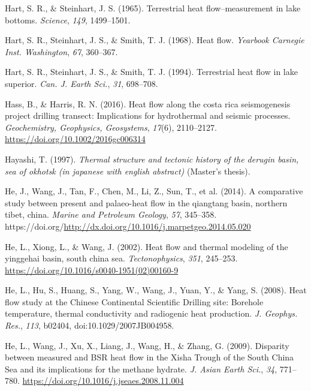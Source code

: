 \begin{CSLReferences}{1}{1}
\leavevmode{}%
Hart, S. R., \& Steinhart, J. S. (1965). Terrestrial heat flow--measurement in lake bottoms. \emph{Science}, \emph{149}, 1499--1501.

\leavevmode{}%
Hart, S. R., Steinhart, J. S., \& Smith, T. J. (1968). Heat flow. \emph{Yearbook Carnegie Inst. Washington}, \emph{67}, 360--367.

\leavevmode{}%
Hart, S. R., Steinhart, J. S., \& Smith, T. J. (1994). Terrestrial heat flow in lake superior. \emph{Can. J. Earth Sci.}, \emph{31}, 698--708.

\leavevmode{}%
Hass, B., \& Harris, R. N. (2016). Heat flow along the costa rica seismogenesis project drilling transect: Implications for hydrothermal and seismic processes. \emph{Geochemistry, Geophysics, Geosystems}, \emph{17}(6), 2110--2127. \url{https://doi.org/10.1002/2016gc006314}

\leavevmode{}%
Hayashi, T. (1997). \emph{Thermal structure and tectonic history of the derugin basin, sea of okhotsk (in japanese with english abstract)} (Master's thesis).

\leavevmode{}%
He, J., Wang, J., Tan, F., Chen, M., Li, Z., Sun, T., et al. (2014). A comparative study between present and palaeo-heat flow in the qiangtang basin, northern tibet, china. \emph{Marine and Petroleum Geology}, \emph{57}, 345--358. https://doi.org/\url{http://dx.doi.org/10.1016/j.marpetgeo.2014.05.020}

\leavevmode{}%
He, L., Xiong, L., \& Wang, J. (2002). Heat flow and thermal modeling of the yinggehai basin, south china sea. \emph{Tectonophysics}, \emph{351}, 245--253. \url{https://doi.org/10.1016/s0040-1951(02)00160-9}

\leavevmode{}%
He, L., Hu, S., Huang, S., Yang, W., Wang, J., Yuan, Y., \& Yang, S. (2008). Heat flow study at the {Chinese Continental Scientific Drilling} site: Borehole temperature, thermal conductivity and radiogenic heat production. \emph{J. Geophys. Res.}, \emph{113}, b02404, doi:10.1029/2007JB004958.

\leavevmode{}%
He, L., Wang, J., Xu, X., Liang, J., Wang, H., \& Zhang, G. (2009). Disparity between measured and {BSR heat flow in the Xisha Trough of the South China Sea} and its implications for the methane hydrate. \emph{J. Asian Earth Sci.}, \emph{34}, 771--780. \url{https://doi.org/10.1016/j.jseaes.2008.11.004}


\end{CSLReferences}
